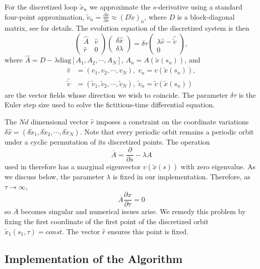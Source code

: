\documentclass[aip,cha,reprint,
secnumarabic,
nofootinbib, tightenlines,
nobibnotes, showkeys, showpacs,
groupedaddress
]{revtex4-1}
\begin{document}
For the discretized loop $\tilde{x}_n$ we approximate the $s$-derivative
using a standard four-point approximation, $\tilde{v}_n=\frac{\partial
\tilde{x}}{\partial s} \approx  (D\tilde{x})_n$, where $D$ is a
block-diagonal matrix, see  for details.  The evolution
equation  of the discretized system is then
\begin{equation}
\begin{pmatrix} \hat{A} & \hat{v} \\ \hat{r} & 0 \end{pmatrix}
    \begin{pmatrix} \delta\hat{x} \\ \delta\lambda \end{pmatrix}
    =\delta\tau  \begin{pmatrix} \lambda\hat{v}-\hat{\tilde{v}} \\ 0 \end{pmatrix},
\label{POEqnDisc}
\end{equation}
where $\hat{A}=D-\lambda\mbox{diag}[A_1,A_2,\cdots,A_N]$, $A_n=A(\tilde{x}(s_n))$, and
\begin{align}
\hat{v} &=(v_1,v_2,\cdots,v_N), \; v_n=v(\tilde{x}(s_n)),\\
\hat{\tilde{v}} &=(\tilde{v}_1,\tilde{v}_2,\cdots,\tilde{v}_N), \;  \tilde{v}_n=\tilde{v}(\tilde{x}(s_n))
\nonumber
\end{align}
are the vector fields whose direction we wish to coincide.  The parameter $\delta\tau$ is the Euler step size used to solve the fictitious-time differential equation.

The $Nd$ dimensional vector $\hat{r}$ imposes a constraint on the coordinate variations
$\delta \hat{x}=(\delta\tilde{x}_1,\delta\tilde{x}_2,\cdots,\delta\tilde{x}_N)$.  Note that every periodic orbit remains a periodic orbit under a cyclic permutation of its discretized points.  The operation
\[
\overline{A}=\frac{\partial}{\partial s} - \lambda A
\]
used in  therefore has a marginal eigenvector $v(\tilde{x}(s))$ with zero eigenvalue.  As we discuss below, the parameter $\lambda$ is fixed in our implementation.  Therefore, as $\tau \to \infty$,
\[
 \overline{A}\frac{\partial x}{\partial \tau}=0
 \]
so $\overline{A}$ becomes singular and numerical issues arise.  We remedy
this problem by fixing the first coordinate of the first point of the
discretized orbit $\tilde{x}_1(s_1,\tau)=const$.  The vector $\hat{r}$
ensures this point is fixed.

\subsection{Implementation of the Algorithm}
\end{document}
